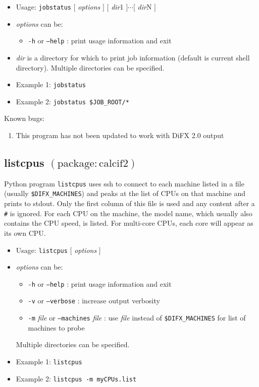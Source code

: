 \begin{itemize}
\item[] Usage: {\tt jobstatus} $[$ {\em options} $]$ $[$ {\em dir}1 $] \cdots [$ {\em dir}N $]$
\item[] {\em options} can be:
\begin{itemize}
\item[] {\tt -h} or {\tt --help} : print usage information and exit
\end{itemize}
\item[] {\em dir} is a directory for which to print job information (default is current shell directory).
Multiple directories can be specified.
\item[] Example 1: {\tt jobstatus}
\item[] Example 2: {\tt jobstatus \$JOB\_ROOT/*}
\end{itemize}


\noindent
Known bugs:
\begin{enumerate}
\item This program has not been updated to work with DiFX 2.0 output
\end{enumerate}







\subsection{listcpus {\small $\mathrm{(package: calcif2)}$}} \label{sec:listcpus}

Python program {\tt listcpus} uses ssh to connect to each machine listed in a file (usually {\tt \$DIFX\_MACHINES}) and peaks at the list of CPUs on that machine and prints to stdout.
Only the first column of this file is used and any content after a {\tt \#} is ignored.
For each CPU on the machine, the model name, which usually also contains the CPU speed, is listed.
For multi-core CPUs, each core will appear as its own CPU.

\begin{itemize}
\item[] Usage: {\tt listcpus} $[$ {\em options} $]$
\item[] {\em options} can be:
\begin{itemize}
\item[] {\tt -h} or {\tt --help} : print usage information and exit
\item[] {\tt -v} or {\tt --verbose} : increase output verbosity
\item[] {\tt -m} {\em file} or {\tt --machines} {\em file} : use {\em file} instead of {\tt \$DIFX\_MACHINES} for list of machines to probe
\end{itemize}
Multiple directories can be specified.
\item[] Example 1: {\tt listcpus}
\item[] Example 2: {\tt listcpus -m myCPUs.list}
\end{itemize}








